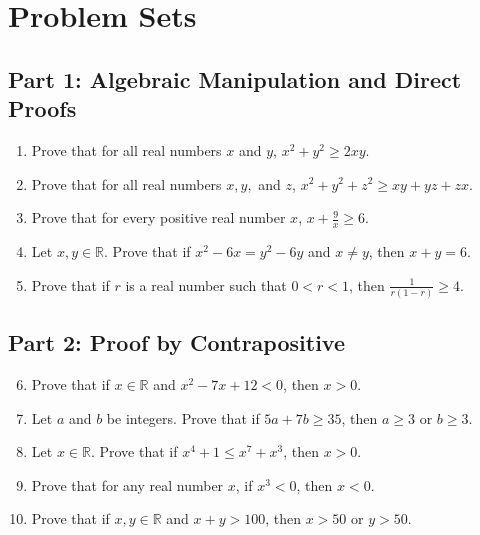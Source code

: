 \documentclass[11pt]{article}
\begin{document}
\newpage

\section{Problem Sets}
\label{sec:problems}

\subsection{Part 1: Algebraic Manipulation and Direct Proofs}
\begin{enumerate}
    \item Prove that for all real numbers $x$ and $y$, $x^2 + y^2 \ge 2xy$.
    \item Prove that for all real numbers $x, y,$ and $z$, $x^2 + y^2 + z^2 \ge xy + yz + zx$.
    \item Prove that for every positive real number $x$, $x + \frac{9}{x} \ge 6$.
    \item Let $x, y \in \mathbb{R}$. Prove that if $x^2 - 6x = y^2 - 6y$ and $x \neq y$, then $x + y = 6$.
    \item Prove that if $r$ is a real number such that $0 < r < 1$, then $\frac{1}{r(1-r)} \ge 4$.
\end{enumerate}

\subsection{Part 2: Proof by Contrapositive}
\begin{enumerate}
    \setcounter{enumi}{5}
    \item Prove that if $x \in \mathbb{R}$ and $x^2 - 7x + 12 < 0$, then $x > 0$.
    \item Let $a$ and $b$ be integers. Prove that if $5a + 7b \ge 35$, then $a \ge 3$ or $b \ge 3$.
    \item Let $x \in \mathbb{R}$. Prove that if $x^4 + 1 \le x^7 + x^3$, then $x > 0$.
    \item Prove that for any real number $x$, if $x^3 < 0$, then $x < 0$.
    \item Prove that if $x, y \in \mathbb{R}$ and $x + y > 100$, then $x > 50$ or $y > 50$.
\end{enumerate}
\end{document}
